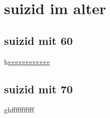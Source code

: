 \section{suizid im alter}
\label{sec:suizidImAlter}
\subsection{suizid mit 60}
\label{sec:suizidMit60}
hgggggggggggg
\subsection{suizid mit 70}
\label{sec:suizidMit70}
ghfffffffffff
